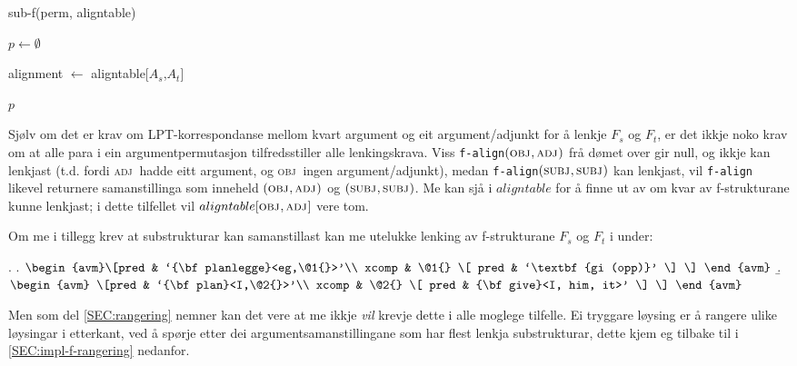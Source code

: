 \documentclass[12pt,a4paper,oneside,draft]{report}
\newcommand{\F}[2]{\textsc{#1}\ensuremath{_{#2}}}
\newcommand{\OBJ}{\F{obj}{}}
\newcommand{\OBJs}{\F{obj~}{}}
\newcommand{\ADJ}{\F{adj}{}}
\newcommand{\ADJs}{\F{adj~}{}}
\newcommand{\SUBJ}{\F{subj}{}}
\newcommand{\p}[1]{`\textbf{#1}'}
\begin{document}
  \begin{algorithm}[htbp]
    \caption{sub-f(perm, aligntable)}
    \label{algo:sub-f}
    
    $p \gets \emptyset$  \;
         {
           {
            alignment $\gets$ aligntable[$A_s$,$A_t$] \;
          }
          
        }
    \Return $p$
  \end{algorithm}    

Sjølv om det er krav om LPT\hyp{}korrespondanse mellom kvart argument og
eit argument/adjunkt for å lenkje $F_s$ og $F_t$, er det ikkje noko
krav om at alle para i ein argumentpermutasjon tilfredsstiller alle
lenkingskrava. Viss \texttt{f-align}$(\OBJ,\ADJ)$ frå dømet over gir
null, og ikkje kan lenkjast (t.d. fordi \ADJs hadde eitt argument, og
\OBJs ingen argument/adjunkt), medan \texttt{f-align}$(\SUBJ,\SUBJ)$
kan lenkjast, vil \texttt{f-align} likevel returnere samanstillinga som
inneheld $(\OBJ,\ADJ)$ og $(\SUBJ,\SUBJ)$. Me kan sjå i $aligntable$
for å finne ut av om kvar av f\hyp{}strukturane kunne lenkjast; i dette
tilfellet vil $aligntable[\OBJ,\ADJ]$ vere tom.



Om me i tillegg krev at substrukturar kan samanstillast kan me
utelukke lenking av f\hyp{}strukturane $F_s$ og $F_t$ i \Next under:

{\avmoptions{}
\ex. \a.  $\begin{avm}\[pred & `{\bf planlegge}<eg,\@1{}>'\\
   xcomp & \@1{} \[  pred & \p{gi (opp)} \] \] \end{avm}$
  \b. $\begin{avm} \[pred & `{\bf plan}<I,\@2{}>'\\
   xcomp & \@2{} \[  pred & {\bf give}<I, him, it>' \] \] \end{avm}$

}

Men som del \ref{SEC:rangering} nemner kan det vere at me ikkje \emph{vil}
krevje dette i alle moglege tilfelle. Ei tryggare løysing er å rangere
ulike løysingar i etterkant, ved å spørje etter dei
argumentsamanstillingane som har flest lenkja substrukturar, dette
kjem eg tilbake til i \ref{SEC:impl-f-rangering} nedanfor.
\end{document}

